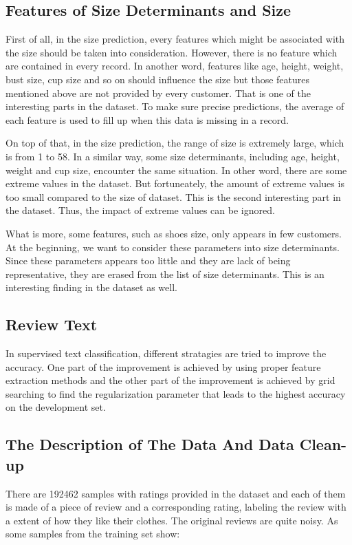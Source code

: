 \documentclass[letterpaper, 10 pt, conference]{ieeeconf}  %
\begin{document}
	\subsection{Features of Size Determinants and Size} 
	First of all, in the size prediction, every features which might be associated with the size should be taken into consideration. However, there is no feature which are contained in every record. In another word, features like age, height, weight, bust size, cup size and so on should influence the size but those features mentioned above are not provided by every customer. That is one of the interesting parts in the dataset. To make sure precise predictions, the average of each feature is used to fill up when this data is missing in a record.
	
	On top of that, in the size prediction, the range of size is extremely large, which is from 1 to 58. In a similar way, some size determinants, including age, height, weight and cup size, encounter the same situation. In other word, there are some extreme values in the dataset. But fortuneately, the amount of extreme values is too small compared to the size of dataset. This is the second interesting part in the dataset. Thus, the impact of extreme values can be ignored.
	
	What is more, some features, such as shoes size, only appears in few customers. At the beginning, we want to consider these parameters into size determinants. Since these parameters appears too little and they are lack of being representative, they are erased from the list of size determinants. This is an interesting finding in the dataset as well. 

	\subsection{Review Text}
	In supervised text classification, different stratagies are tried to improve the accuracy. One part of the improvement is achieved by using proper feature extraction methods and the other part of the improvement is achieved by grid searching to find the regularization parameter that leads to the highest accuracy on the development set.
	
	
\subsection{The Description of The Data And Data Clean-up}

There are 192462 samples with ratings provided in the dataset and each of them is made of a piece of review and a corresponding rating, labeling the review with a extent of how they like their clothes.
The original reviews are quite noisy. As some samples from the training set show:
\end{document}
